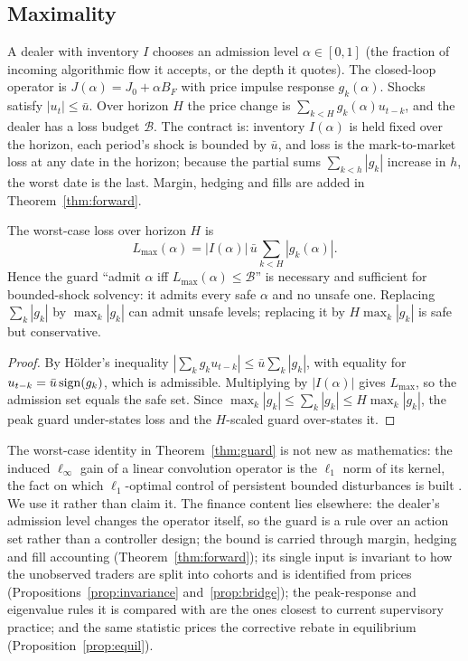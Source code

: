 \subsection{Maximality}
A dealer with inventory $I$ chooses an admission level $\alpha\in[0,1]$ (the fraction of incoming algorithmic flow it accepts, or the depth it quotes). The closed-loop operator is $J(\alpha)=J_0+\alpha B_F$ with price impulse response $g_k(\alpha)$. Shocks satisfy $|u_t|\le\bar u$. Over horizon $H$ the price change is $\sum_{k<H}g_k(\alpha)u_{t-k}$, and the dealer has a loss budget $\mathcal B$. The contract is: inventory $I(\alpha)$ is held fixed over the horizon, each period's shock is bounded by $\bar u$, and loss is the mark-to-market loss at any date in the horizon; because the partial sums $\sum_{k<h}|g_k|$ increase in $h$, the worst date is the last. Margin, hedging and fills are added in Theorem~\ref{thm:forward}.

\begin{theorem}\label{thm:guard}
The worst-case loss over horizon $H$ is
\[
L_{\max}(\alpha)=|I(\alpha)|\,\bar u\sum_{k<H}|g_k(\alpha)|.
\]
Hence the guard ``admit $\alpha$ iff $L_{\max}(\alpha)\le\mathcal B$'' is necessary and sufficient for bounded-shock solvency: it admits every safe $\alpha$ and no unsafe one. Replacing $\sum_k|g_k|$ by $\max_k|g_k|$ can admit unsafe levels; replacing it by $H\max_k|g_k|$ is safe but conservative.
\end{theorem}

\begin{proof}
By H\"older's inequality $|\sum_kg_ku_{t-k}|\le\bar u\sum_k|g_k|$, with equality for $u_{t-k}=\bar u\,{\rm sign}(g_k)$, which is admissible. Multiplying by $|I(\alpha)|$ gives $L_{\max}$, so the admission set equals the safe set. Since $\max_k|g_k|\le\sum_k|g_k|\le H\max_k|g_k|$, the peak guard under-states loss and the $H$-scaled guard over-states it.
\end{proof}

The worst-case identity in Theorem~\ref{thm:guard} is not new as mathematics: the induced $\ell_\infty$ gain of a linear convolution operator is the $\ell_1$ norm of its kernel, the fact on which $\ell_1$-optimal control of persistent bounded disturbances is built \citep{vidyasagar1986,dahleh1987,dahleh1995}. We use it rather than claim it. The finance content lies elsewhere: the dealer's admission level changes the operator itself, so the guard is a rule over an action set rather than a controller design; the bound is carried through margin, hedging and fill accounting (Theorem~\ref{thm:forward}); its single input is invariant to how the unobserved traders are split into cohorts and is identified from prices (Propositions~\ref{prop:invariance} and~\ref{prop:bridge}); the peak-response and eigenvalue rules it is compared with are the ones closest to current supervisory practice; and the same statistic prices the corrective rebate in equilibrium (Proposition~\ref{prop:equil}).

